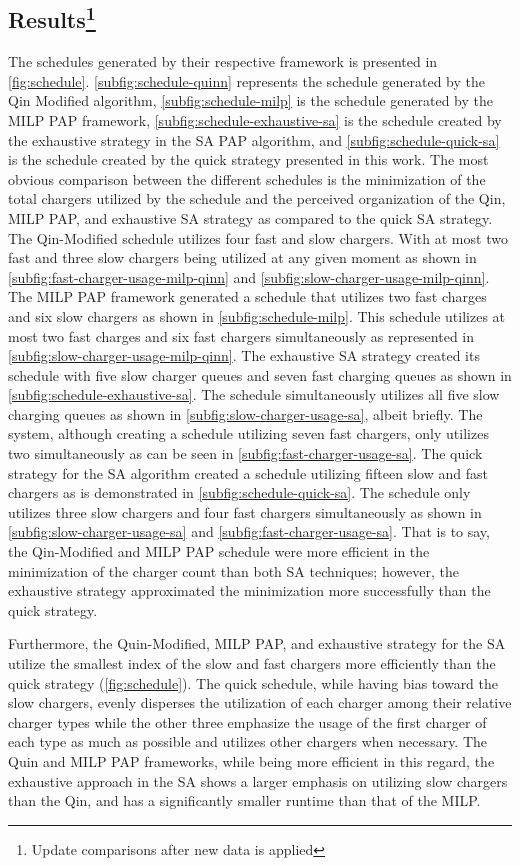 \documentclass[11pt,a4paper,final]{article}
\begin{document}
\subsection{Results\footnote{Update comparisons after new data is applied}}
\label{sec:results}
The schedules generated by their respective framework is presented in \ref{fig:schedule}. \ref{subfig:schedule-quinn}
represents the schedule generated by the Qin Modified algorithm, \ref{subfig:schedule-milp} is the schedule generated by
the MILP PAP framework, \ref{subfig:schedule-exhaustive-sa} is the schedule created by the exhaustive strategy in the SA
PAP algorithm, and \ref{subfig:schedule-quick-sa} is the schedule created by the quick strategy presented in this work.
The most obvious comparison between the different schedules is the minimization of the total chargers utilized by the
schedule and the perceived organization of the Qin, MILP PAP, and exhaustive SA strategy as compared to the quick SA
strategy. The Qin-Modified schedule utilizes four fast and slow chargers. With at most two fast and three slow chargers
being utilized at any given moment as shown in \ref{subfig:fast-charger-usage-milp-qinn} and
\ref{subfig:slow-charger-usage-milp-qinn}. The MILP PAP framework generated a schedule that utilizes two fast charges
and six slow chargers as shown in \ref{subfig:schedule-milp}. This schedule utilizes at most two fast charges and six
fast chargers simultaneously as represented in \ref{subfig:slow-charger-usage-milp-qinn}. The exhaustive SA strategy
created its schedule with five slow charger queues and seven fast charging queues as shown in
\ref{subfig:schedule-exhaustive-sa}. The schedule simultaneously utilizes all five slow charging queues as shown in
\ref{subfig:slow-charger-usage-sa}, albeit briefly. The system, although creating a schedule utilizing seven fast
chargers, only utilizes two simultaneously as can be seen in \ref{subfig:fast-charger-usage-sa}. The quick strategy for
the SA algorithm created a schedule utilizing fifteen slow and fast chargers as is demonstrated in
\ref{subfig:schedule-quick-sa}. The schedule only utilizes three slow chargers and four fast chargers simultaneously as
shown in \ref{subfig:slow-charger-usage-sa} and \ref{subfig:fast-charger-usage-sa}. That is to say, the Qin-Modified and
MILP PAP schedule were more efficient in the minimization of the charger count than both SA techniques; however, the
exhaustive strategy approximated the minimization more successfully than the quick strategy.

Furthermore, the Quin-Modified, MILP PAP, and exhaustive strategy for the SA utilize the smallest index of the slow and
fast chargers more efficiently than the quick strategy (\ref{fig:schedule}). The quick schedule, while having bias
toward the slow chargers, evenly disperses the utilization of each charger among their relative charger types while the
other three emphasize the usage of the first charger of each type as much as possible and utilizes other chargers when
necessary. The Quin and MILP PAP frameworks, while being more efficient in this regard, the exhaustive approach in the
SA shows a larger emphasis on utilizing slow chargers than the Qin, and has a significantly smaller runtime than that of
the MILP.
\end{document}
